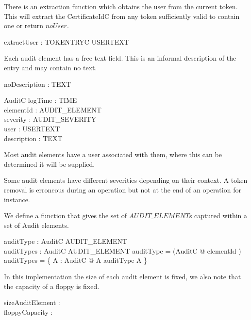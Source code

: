 There is an extraction function which obtains the user from the
current token. This will extract the CertificateIdC from any token
sufficiently valid to contain one or return $noUser$.

\begin{axdef}
        extractUser : TOKENTRYC \fun USERTEXT
\end{axdef}

Each audit element has a free text field. This is an informal
description of the entry and may contain no text.

\begin{zed}
        [ TEXT ]
\end{zed}

\begin{axdef}
        noDescription : TEXT
\end{axdef}


\begin{schema}{AuditC}
        logTime : TIME
\\      elementId : AUDIT\_ELEMENT
\\      severity : AUDIT\_SEVERITY
\\      user : USERTEXT
\\      description : TEXT  
\end{schema}
Most audit elements have a user associated with them, where this can
be determined it will be supplied.

Some audit elements have different severities depending on their
context. A token removal is erroneous during an operation but not at
the end of an operation for instance.

We define a function that gives the set of $AUDIT\_ELEMENT$s captured
within a set of Audit elements. 
\begin{axdef}
        auditType :  AuditC \fun  AUDIT\_ELEMENT
\\      auditTypes : \finset AuditC \fun \finset AUDIT\_ELEMENT
\where
        auditType = (\lambda AuditC @ elementId )
\\      auditTypes = \{ A : \finset AuditC @ A \mapsto auditType \limg
A \rimg \}
\end{axdef}


In this implementation the size of each audit element is fixed, we
also note that the capacity of a floppy is fixed.
\begin{axdef}
        sizeAuditElement : \nat
\\      floppyCapacity : \nat
\end{axdef}

